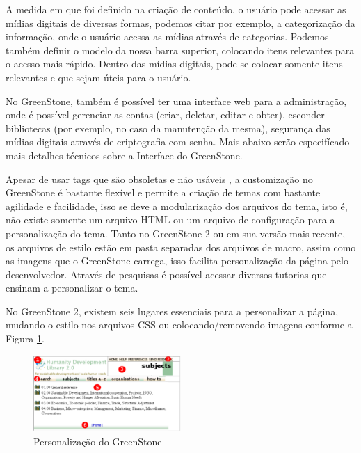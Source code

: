 A medida em que foi definido na criação de conteúdo, o usuário pode acessar as mídias digitais de diversas formas, podemos citar por exemplo, a categorização da informação, onde o usuário acessa as mídias através de categorias. Podemos também definir o modelo da nossa barra superior, colocando itens relevantes para o acesso mais rápido. Dentro das mídias digitais, pode-se colocar somente itens relevantes e que sejam úteis para o usuário.

No GreenStone, também é possível ter uma interface web para a administração, onde é possível gerenciar as contas (criar, deletar, editar e obter), esconder bibliotecas (por exemplo, no caso da manutenção da mesma), segurança das mídias digitais através de criptografia com senha. Mais abaixo serão especifícado mais detalhes técnicos sobre a Interface do GreenStone.

Apesar de usar tags que são obsoletas e não usáveis , a customização no GreenStone é bastante flexível e permite a criação de temas com bastante agilidade e facilidade, isso se deve a modularização dos arquivos do tema, isto é, não existe somente um arquivo HTML ou um arquivo de configuração para a personalização do tema. Tanto no GreenStone 2 ou em sua versão mais recente, os arquivos de estilo estão em pasta separadas dos arquivos de macro, assim como as imagens que o GreenStone carrega, isso  facilita personalização da página pelo desenvolvedor. Através de pesquisas é possível acessar diversos tutorias que ensinam a personalizar o tema.

No GreenStone 2, existem seis lugares essenciais para a personalizar a página, mudando o estilo nos arquivos CSS ou colocando/removendo imagens conforme a Figura \ref{fig:esqueletogreenstone}.

\graphicspath{{figuras/}}
\begin{figure}[H]
\centering
\includegraphics[width=0.5\textwidth]{esqueleto_greenstone}
\caption{Personalização do GreenStone}
\label{fig:esqueletogreenstone}
\end{figure}

